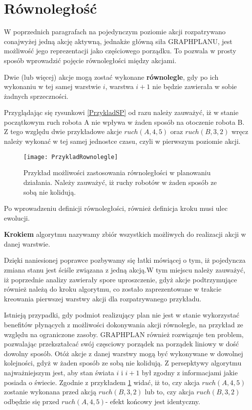     \section{Równoległość}
    \label{Rownoleglosc}
    W poprzednich paragrafach na pojedynczym poziomie akcji rozpatrywano conajwyżej jedną akcję aktywną, jednakże główną siła GRAPHPLANU, jest 
    możliwość jego reprezentacji jako częściowego porządku. To pozwala w prosty sposób wprowadzić pojęcie równoległości między akcjami. 
    \begin{definition}
        \label{Warstwa}
        Dwie (lub więcej) akcje  mogą zostać wykonane \textbf{równolegle}, gdy po ich wykonaniu w tej samej warstwie $i$, warstwa $i+1$ nie będzie 
        zawierała w sobie żadnych sprzeczności.
    \end{definition}
    Przyglądając się rysunkowi \ref{PrzykladSP} od razu należy zauważyć, iż w stanie początkowym ruch robota A nie wpływa w żaden sposób na otoczenie
    robota B. Z tego względu dwie przykładowe akcje $ruch(A,4,5)$ oraz $ruch(B,3,2)$ wręcz należy wykonać w tej samej jednostce czasu, czyli w pierwszym
    poziomie akcji. 
    \begin{figure}[H]
        \texttt{[image: PrzykladRownolegle]}
        \centering
        \caption{Przykład możliwości zastosowania równoległości w planowaniu działania. Należy zauważyć, iż ruchy robotów w żaden sposób ze sobą
        nie kolidują.}
        \label{PrzykladRownolegle}
    \end{figure}
    
    Po wprowadzeniu definicji równoległości, również definicja kroku musi ulec ewolucji. 
    \begin{definition}
        \label{Krok}
        \textbf{Krokiem} algorytmu nazywamy zbiór wszystkich możliwych do realizacji akcji w danej warstwie.
    \end{definition}
    Dzięki naniesionej poprawce pozbywamy się łatki mówiącej o tym, iż pojedyncza zmiana stanu jest ściśle związana z jedną akcją.W tym miejscu należy 
    zauważyć, iż poprzednie analizy zawierały spore uproszczenie, gdyż akcje podtrzymujące również należą do kroku algorytmu, co zostało zaprezentowane
    w trakcie kreowania pierwszej warstwy akcji dla rozpatrywanego przykładu. 

    Istnieją przypadki, gdy podmiot realizujący plan nie jest w stanie wykorzystać benefitów płynących z możliwości dokonywania akcji równolegle, 
    na przykład ze względu na ograniczone zasoby. GRAPHPLAN również rozwiązuje ten problem, pozwalając przekształcać swój częsciowy porządek 
    na porządek liniowy w dość dowolny sposób. Otóż akcje z danej warstwy mogą być wykonywane w dowolnej kolejności, gdyż w żaden sposób ze sobą nie 
    kolidują. Z persepktywy algorytmu najważniejszym jest, aby stan świata $i$ i $i+1$ był zgodny z informacjami jakie posiada o świecie. Zgodnie z
    przykładem \ref{PrzykladRownolegle} widać, iż to, czy akcja $ruch(A,4,5)$ zostanie wykonana przed akcją $ruch(B,3,2)$ lub to, czy akcja 
    $ruch(B,3,2)$ odbędzie się prxed $ruch(A,4,5)$- efekt końcowy jest identyczny.

